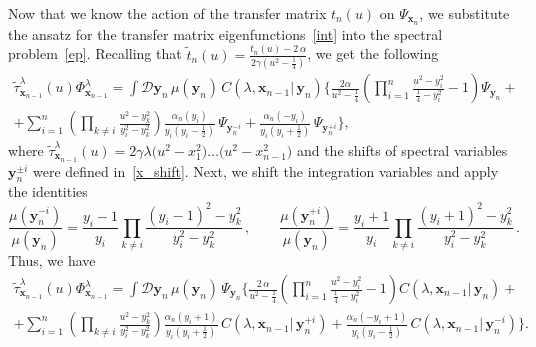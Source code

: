 \documentclass[a4paper,11pt]{article}
\numberwithin{equation}{section}
\begin{document}
Now that we know the action of the transfer matrix $t_n(u)$ on $\Psi_{\bm{x}_n}$, we substitute the ansatz for the transfer matrix eigenfunctions~\eqref{int} into the spectral problem~\eqref{ep}.
Recalling that $\tilde{t}_n(u) = \frac{t_n(u) - 2\,\alpha}{2\gamma(u^{2}-\frac{1}{4})}$, we get the following
\begin{multline*}
    \tilde{\tau}^{\lambda}_{\bm{x}_{n-1}}(u)\Phi_{\bm{x}_{n-1}}^{\lambda} = \int \mathcal{D}\bm{y}_n \,\mu(\bm{y}_n)\,C(\lambda, \bm{x}_{n-1}|\,\bm{y}_{n})\Biggl\{\frac{2\alpha}{u^2-\frac{1}{4}}\left(\prod_{i=1}^{n}\frac{u^2-y_i^2}{\frac{1}{4}-y_i^2}-1\right) \Psi_{\bm{y}_n} + \\ 
    + \sum_{i=1}^{n}\left(\prod_{k \neq i}\frac{u^2-y_k^2}{y_i^2-y_k^2}\right) 
    \frac{\alpha_n(y_i)}{y_i(y_i-\frac{1}{2})}\,\Psi_{\bm{y}_n^{-i}} + \frac{\alpha_n(-y_i)}{y_i(y_i+\frac{1}{2})}\,\Psi_{\bm{y}_n^{+i}} \Biggr\} ,
\end{multline*} 
where $\tilde{\tau}^{\lambda}_{\bm{x}_{n-1}}(u) = 2\gamma\lambda \bigl(u^2-x_1^2\bigr) \ldots \bigl(u^2-x_{n-1}^2\bigr)$ and the shifts of spectral variables $\bm{y}_n^{\pm i}$ were defined in~\eqref{x_shift}.
Next, we shift the integration variables and apply the identities
\begin{equation*}
    \frac{\mu(\bm{y}_n^{-i})}{\mu(\bm{y}_n)} = \frac{y_i-1}{y_i}\prod\limits_{k \neq i} \frac{(y_i - 1)^2-y_k^2}{y_i^2-y_k^2} \,, \qquad \frac{\mu(\bm{y}_n^{+i})}{\mu(\bm{y}_n)} = \frac{y_i+1}{y_i}\prod\limits_{k \neq i} \frac{(y_i + 1)^2-y_k^2}{y_i^2-y_k^2} \,.
\end{equation*}    
Thus, we have
\begin{multline} \label{tauPhi}
    \tilde{\tau}^{\lambda}_{\bm{x}_{n-1}}(u)\Phi_{\bm{x}_{n-1}}^{\lambda} = \int \mathcal{D}\bm{y}_n \,\mu(\bm{y}_n)\,\Psi_{\bm{y}_n}\Biggl\{\frac{2\,\alpha}{u^2-\frac{1}{4}}\left(\prod_{i=1}^{n}\frac{u^2-y_i^2}{\frac{1}{4}-y_i^2}-1\right) C(\lambda, \bm{x}_{n-1}|\,\bm{y}_{n}) + \\ 
    + \sum_{i=1}^{n}\left(\prod_{k \neq i}\frac{u^2-y_k^2}{y_i^2-y_k^2}\right)
    \frac{\alpha_n(y_i+1)}{y_i(y_i+\frac{1}{2})}\,C(\lambda, \bm{x}_{n-1}|\,\bm{y}_{n}^{+i}) + \frac{\alpha_n(-y_i+1)}{y_i(y_i-\frac{1}{2})}\,C(\lambda, \bm{x}_{n-1}|\,\bm{y}_{n}^{-i}) \Biggr\} .
\end{multline}
\end{document}
